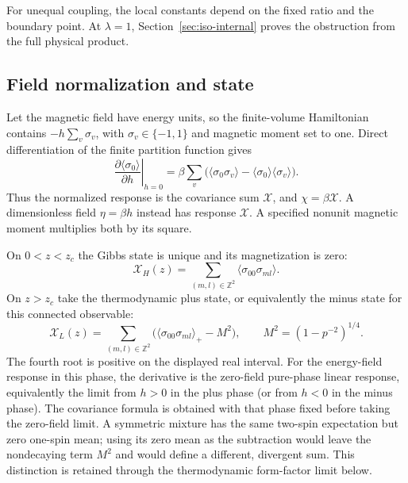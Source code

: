 \documentclass[11pt]{article}
\numberwithin{equation}{section}
\theoremstyle{definition}
\newcommand{\Z}{\mathbb Z}
\newcommand{\XH}{\mathcal X_H}
\newcommand{\XL}{\mathcal X_L}
\begin{document}
For unequal coupling, the local constants depend on the fixed ratio
and the boundary point. At $\lambda=1$, Section~\ref{sec:iso-internal}
proves the obstruction from the full physical product.

\subsection{Field normalization and state}
Let the magnetic field have energy units, so the finite-volume Hamiltonian
contains $-h\sum_v\sigma_v$, with $\sigma_v\in\{-1,1\}$ and magnetic
moment set to one. Direct differentiation of the finite partition
function gives
\[
 \left.\frac{\partial\langle\sigma_0\rangle}{\partial h}\right|_{h=0}
 =\beta\sum_v\bigl(\langle\sigma_0\sigma_v\rangle
                         -\langle\sigma_0\rangle\langle\sigma_v\rangle\bigr).
\]
Thus the normalized response is the covariance sum $\mathcal X$, and
$\chi=\beta\mathcal X$. A dimensionless field $\eta=\beta h$ instead
has response $\mathcal X$. A specified nonunit magnetic moment multiplies
both by its square.

On $0<z<z_c$ the Gibbs state is unique and its magnetization is zero:
\[
 \XH(z)=\sum_{(m,l)\in\Z^2}\langle\sigma_{00}\sigma_{ml}\rangle.
\]
On $z>z_c$ take the thermodynamic plus state, or equivalently the minus
state for this connected observable:
\[
 \XL(z)=\sum_{(m,l)\in\Z^2}
       \bigl(\langle\sigma_{00}\sigma_{ml}\rangle_+-M^2\bigr),
 \qquad M^2=(1-p^{-2})^{1/4}.
\]
The fourth root is positive on the displayed real interval.
For the energy-field response in this phase, the derivative is the
zero-field pure-phase linear response, equivalently the limit from
$h>0$ in the plus phase (or from $h<0$ in the minus phase).
The covariance formula is obtained with that phase fixed before taking
the zero-field limit. A symmetric
mixture has the same two-spin expectation but zero one-spin mean; using
its zero mean as the subtraction would leave the nondecaying term $M^2$
and would define a different, divergent sum. This distinction is retained
through the thermodynamic form-factor limit below.
\end{document}
